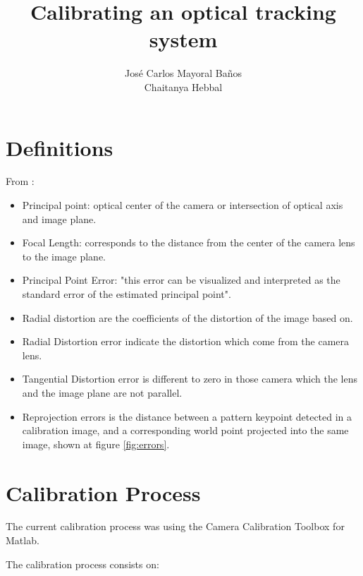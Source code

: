\documentclass[12pt]{scrartcl}
\title{Calibrating an optical tracking system}
\author{Jos\'e Carlos Mayoral Ba\~nos\\
		Chaitanya Hebbal}
\begin{document}
\maketitle

\section*{Definitions}

From \cite{MatlabDoc}:

\begin{itemize}
\item Principal point: optical center of the camera or intersection of optical axis and image plane.
\item Focal Length: corresponds to the distance from the center of the camera lens to the image plane. 
\item Principal Point Error: "this error can be visualized and interpreted as the standard error of the estimated principal point". 
\item Radial distortion are the coefficients of the distortion of the image based on.
\item Radial Distortion error indicate the distortion which come from the camera lens.
\item Tangential Distortion error is different to zero in those camera which the lens and the image plane are not parallel.
\item Reprojection errors is the distance between a pattern keypoint detected in a calibration image, and a corresponding world point projected into the same image, shown at figure \ref{fig:errors}.
\end{itemize}

\section*{Calibration Process}

The current calibration process was using the Camera Calibration Toolbox for Matlab.

The calibration process consists on:
\end{document}
